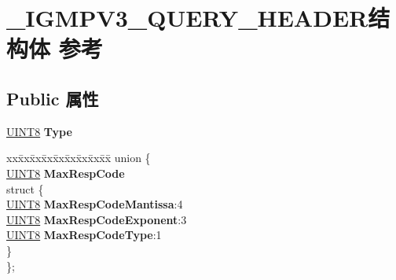 \hypertarget{struct___i_g_m_p_v3___q_u_e_r_y___h_e_a_d_e_r}{}\section{\+\_\+\+I\+G\+M\+P\+V3\+\_\+\+Q\+U\+E\+R\+Y\+\_\+\+H\+E\+A\+D\+E\+R结构体 参考}
\label{struct___i_g_m_p_v3___q_u_e_r_y___h_e_a_d_e_r}
\subsection*{Public 属性}
\begin{DoxyCompactItemize}
\item 
\mbox{\label{struct___i_g_m_p_v3___q_u_e_r_y___h_e_a_d_e_r_afb5c8683143c5a438786af66b9d5e1ac}} 
\hyperlink{_processor_bind_8h_ab27e9918b538ce9d8ca692479b375b6a}{U\+I\+N\+T8} {\bfseries Type}
\item 
\mbox{\label{struct___i_g_m_p_v3___q_u_e_r_y___h_e_a_d_e_r_a0bc05e7872bc3429391d312c30b46e20}} 
\begin{tabbing}
xx\=xx\=xx\=xx\=xx\=xx\=xx\=xx\=xx\=\kill
union \{\\
\>\hyperlink{_processor_bind_8h_ab27e9918b538ce9d8ca692479b375b6a}{UINT8} {\bfseries MaxRespCode}\\
\mbox{\label{union___i_g_m_p_v3___q_u_e_r_y___h_e_a_d_e_r_1_1_0D2653_af37d204c50b979685077f28497a36dde}} 
\>struct \{\\
\>\>\hyperlink{_processor_bind_8h_ab27e9918b538ce9d8ca692479b375b6a}{UINT8} {\bfseries MaxRespCodeMantissa}:4\\
\>\>\hyperlink{_processor_bind_8h_ab27e9918b538ce9d8ca692479b375b6a}{UINT8} {\bfseries MaxRespCodeExponent}:3\\
\>\>\hyperlink{_processor_bind_8h_ab27e9918b538ce9d8ca692479b375b6a}{UINT8} {\bfseries MaxRespCodeType}:1\\
\>\} \\
\}; \\


\end{tabbing}
\end{DoxyCompactItemize}
